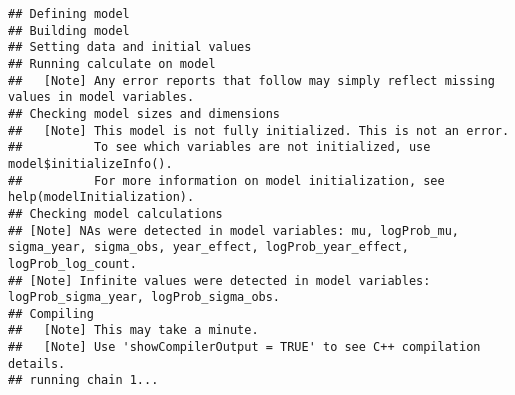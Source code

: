 \documentclass[
]{article}
\newenvironment{Shaded}{\begin{snugshade}}{\end{snugshade}}
\newcommand{\AttributeTok}[1]{\textcolor[rgb]{0.13,0.29,0.53}{#1}}
\newcommand{\CommentTok}[1]{\textcolor[rgb]{0.56,0.35,0.01}{\textit{#1}}}
\newcommand{\ConstantTok}[1]{\textcolor[rgb]{0.56,0.35,0.01}{#1}}
\newcommand{\DecValTok}[1]{\textcolor[rgb]{0.00,0.00,0.81}{#1}}
\newcommand{\FunctionTok}[1]{\textcolor[rgb]{0.13,0.29,0.53}{\textbf{#1}}}
\newcommand{\NormalTok}[1]{#1}
\newcommand{\OtherTok}[1]{\textcolor[rgb]{0.56,0.35,0.01}{#1}}
\newcommand{\SpecialCharTok}[1]{\textcolor[rgb]{0.81,0.36,0.00}{\textbf{#1}}}
\begin{document}
\begin{Shaded}
\end{Shaded}

\begin{verbatim}
## Defining model
## Building model
## Setting data and initial values
## Running calculate on model
##   [Note] Any error reports that follow may simply reflect missing values in model variables.
## Checking model sizes and dimensions
##   [Note] This model is not fully initialized. This is not an error.
##          To see which variables are not initialized, use model$initializeInfo().
##          For more information on model initialization, see help(modelInitialization).
## Checking model calculations
## [Note] NAs were detected in model variables: mu, logProb_mu, sigma_year, sigma_obs, year_effect, logProb_year_effect, logProb_log_count.
## [Note] Infinite values were detected in model variables: logProb_sigma_year, logProb_sigma_obs.
## Compiling
##   [Note] This may take a minute.
##   [Note] Use 'showCompilerOutput = TRUE' to see C++ compilation details.
## running chain 1...
\end{verbatim}
\end{document}
